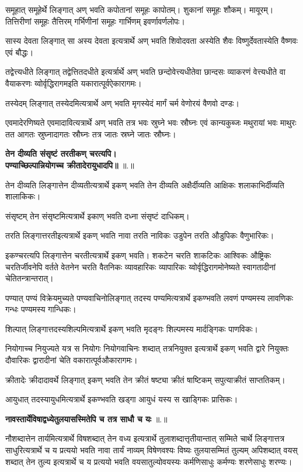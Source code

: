 \documentclass[14pt]{extarticle}   %
\newcounter{sutracount}[subsection]
\newcommand{\sutra}[1]{%
  \stepcounter{sutracount}%
  \textbf{#1} ॥\thesutracount॥%
}
\renewcommand{\thesutracount}{\thesubsection.\arabic{sutracount}}
\begin{document}
समूहात् समूहेर्थे लिङ्गात् अण् भवति कपोतानां समूहः कापोतम्। शुकानां समूहः शौकम्। मायूरम्। तित्तिरीणां समूहः तैत्तिरम् गर्भिणीनां समूहः गार्भिणम् इवर्णावर्णलोपः।

सास्य देवता लिङ्गात् सा अस्य देवता इत्यत्रार्थे अण् भवति शिवोदवता अस्येति शैवः विष्णुर्देवतास्येति वैष्णवः एवं बौद्धः। 

तद्वेत्त्यधीते लिङ्गात् तद्वेत्तितदधीते इत्यर्त्रार्थे अण् भवति छन्दोवेत्त्यधीतेवा छान्दसः व्याकरणं वेत्त्यधीते वा वैयाकरणः य्वोर्वृद्धिरागमइति यकारात्पूर्वऐकारागमः।

तस्येदम् लिङ्गात् तस्येदमित्यत्रार्थे अण् भवति मृगस्येदं मार्गं चर्म वेणोरयं वैणवो दण्डः।

एवमादेरणिष्यते एवमादावित्यत्रार्थे अण् भवति तत्र भवः स्रुघ्ने भवः स्रौघ्नः एवं कान्यकुब्जः मथुरायां भवः माथुरः तत आगतः स्रुघ्नादागतः स्रौघ्नः तत्र जातः स्रघ्ने जातः स्रौघ्नः।

\sutra{तेन दीव्यति संसृष्टं तरतीकण् चरत्यपि।\\ पण्याच्छिल्पान्नियोगच्च क्रीतादेरायुधादपि॥}

तेन दीव्यति लिङ्गात्तेन दीव्यतीत्यत्रार्थे इकण् भवति तेन दीव्यति अक्षैर्दीव्यति आक्षिकः शलाकाभिर्दीव्यति शालाकिकः।

संसृष्टम् तेन संसृष्टमित्यत्रार्थे इकाण् भवति दध्ना संसृष्टं दाधिकम्।

तरति लिङ्गात्तरतीइत्यत्रार्थे इकण् भवति नावा तरति नाविकः उडुपेन तरति औडुपिकः वैणुभारिकः।

इकण्चरत्यपि लिङ्गात्तेन चरतीत्यत्रार्थे इकण् भवति। शकटेन चरति शाकटिकः आश्विकः औष्ट्रिकः चरतिर्जीवनेपि वर्तते वेतनेन चरति वैतनिकः व्यावहारिकः व्यापारिकः य्वोर्वृद्धिरागमोनेष्यते स्वागतादीनां चेतितन्त्रान्तरात्।

पण्यात् पण्यं विक्रेयमुच्यते पण्यवाचिनोलिङ्गात् तदस्य पण्यमित्यत्रार्थे इकण्भवति लवणं पण्यमस्य लावणिकः गन्धः पण्यमस्य गान्धिकः।

शिल्पात् लिङ्गात्तदस्यशिल्पमित्यत्रार्थे इकण् भवति मृदङ्गः शिल्पमस्य मार्दङ्गिकः पाणविकः।

नियोगाच्च नियुज्यते यत्र स नियोगः नियोगवाचिनः शब्दात् तत्रनियुक्त इत्यत्रार्थे इकण् भवति द्वारे नियुक्तः दौवारिकः द्वारादीनां चेति वकारात्पूर्वऔकारागमः।

क्रीतादेः क्रीदादावर्थे लिङ्गात् इकण् भवति तेन क्रीतं षष्ट्या क्रीतं षाष्टिकम् सपुत्याक्रीतं साप्ततिकम्।

आयुधात् तदस्यायुधमित्यत्रार्थे इकण्भवति खड्गा आयुधं यस्य स खाड्गिकः प्रासिकः।

\sutra{नावस्तार्येविषाद्वध्येतुलयासस्मितेपि च तत्र साधौ च यः}

नौशब्दात्तेन तार्यमित्यत्रार्थे विषशब्दात् तेन वध्य इत्यत्रार्थे तुलाशब्दात्तृतीयान्तात् सम्मिते चार्थे लिङ्गात्तत्र साधुरित्यत्रार्थे च य प्रत्ययो भवति नावा तार्यं नाव्यम् विषेणवश्यः विष्यः तुलयासम्मितं तुल्यम् अपिशब्दात् वयस् शब्दात् तेन तुल्य इत्यत्रार्थे च य प्रत्ययो भवति वयसातुल्योवयस्यः कर्मणिसाधुः कर्मण्यः शरणेसाधुः शरण्यः।
\end{document}
